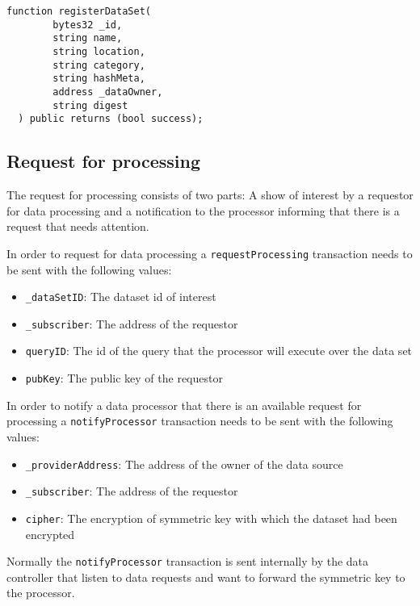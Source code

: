 \begin{lstlisting}[language=Solidity, caption={Data set registration function}]
  function registerDataSet(
        bytes32 _id,
        string name,
        string location,
        string category,
        string hashMeta,
        address _dataOwner,
        string digest
  ) public returns (bool success);
\end{lstlisting}

\subsection{Request for processing}
\label{implemenation:contracts:req_pr}

The request for processing consists of two parts: A show of interest by a requestor for data processing and a notification to the processor informing that there is a request that needs attention.

In order to request for data processing a \verb|requestProcessing| transaction needs to be sent with the following values:

\begin{itemize}
  \item \verb|_dataSetID|: The dataset id of interest
  \item \verb|_subscriber|: The address of the requestor
  \item \verb|queryID|: The id of the query that the processor will execute over the data set
  \item \verb|pubKey|: The public key of the requestor
\end{itemize}

In order to notify a data processor that there is an available request for processing a \verb|notifyProcessor| transaction needs to be sent with the following values:

\begin{itemize}
  \item \verb|_providerAddress|: The address of the owner of the data source
  \item \verb|_subscriber|: The address of the requestor
  \item \verb|cipher|: The encryption of symmetric key with which the dataset had been encrypted
\end{itemize}

Normally the \verb|notifyProcessor| transaction is sent internally by the data controller that listen to data requests and want to forward the symmetric key to the processor.


